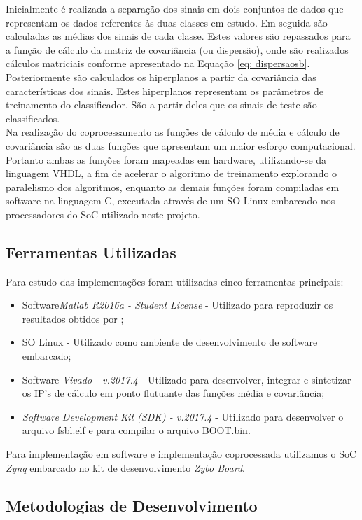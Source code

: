 Inicialmente é realizada a separação dos sinais em dois conjuntos de dados que representam os dados referentes às duas classes em estudo. Em seguida são calculadas as médias dos sinais de cada classe. Estes valores são repassados para a função de cálculo da matriz de covariância (ou dispersão), onde são realizados cálculos matriciais conforme apresentado na Equação \ref{eq: dispersaosb}. Posteriormente são calculados os hiperplanos a partir da covariância das características dos sinais. Estes hiperplanos representam os parâmetros de treinamento do classificador. São a partir deles que os sinais de teste são classificados.\\

Na realização do coprocessamento as funções de cálculo de média e cálculo de covariância são as duas funções que apresentam um maior esforço computacional. Portanto ambas as funções foram mapeadas em hardware, utilizando-se da linguagem VHDL, a fim de acelerar o algoritmo de treinamento explorando o paralelismo dos algoritmos, enquanto as demais funções foram compiladas em software na linguagem C, executada através de um SO Linux embarcado nos processadores do SoC utilizado neste projeto.

\subsection{Ferramentas Utilizadas}
Para estudo das implementações foram utilizadas cinco ferramentas principais:\\
\begin{itemize}
	\item Software\textit{Matlab R2016a - \textit{Student License}} - Utilizado para reproduzir os resultados obtidos por \cite{F.Lotte};
	\item SO Linux - Utilizado como ambiente de desenvolvimento de software embarcado;
	\item Software \textit{Vivado - v.2017.4} - Utilizado para desenvolver, integrar e sintetizar os IP's de cálculo em ponto flutuante das funções média e covariância;
	\item \textit{Software Development Kit (SDK) - v.2017.4} - Utilizado para desenvolver o arquivo fsbl.elf e para compilar o arquivo BOOT.bin.
\end{itemize}

Para implementação em software e implementação coprocessada utilizamos o SoC \textit{Zynq} embarcado no kit de desenvolvimento \textit{Zybo Board}.

\subsection{Metodologias de Desenvolvimento}
